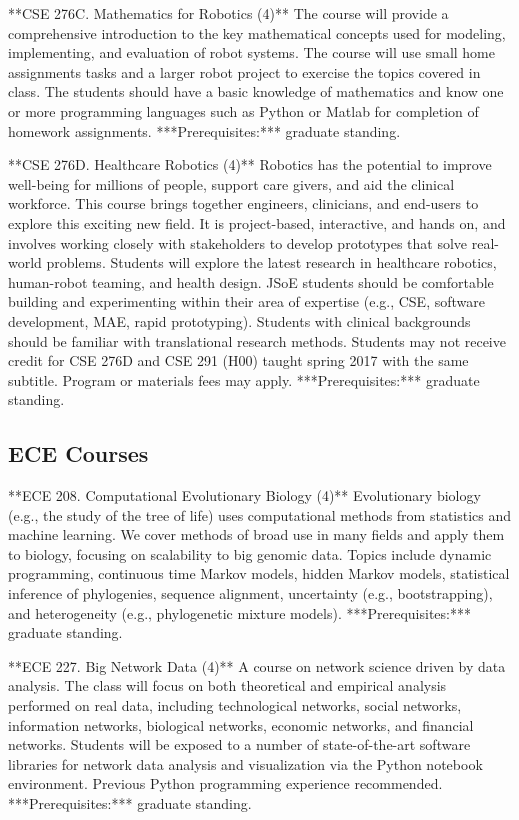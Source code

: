 \documentclass[11pt,letterpaper]{article}
\begin{document}
**CSE 276C. Mathematics for Robotics (4)** The course will provide a
comprehensive introduction to the key mathematical concepts used for
modeling, implementing, and evaluation of robot systems. The course will
use small home assignments tasks and a larger robot project to exercise
the topics covered in class. The students should have a basic knowledge
of mathematics and know one or more programming languages such as Python
or Matlab for completion of homework assignments. ***Prerequisites:***
graduate standing.

**CSE 276D. Healthcare Robotics (4)** Robotics has the potential to
improve well-being for millions of people, support care givers, and aid
the clinical workforce. This course brings together engineers,
clinicians, and end-users to explore this exciting new field. It is
project-based, interactive, and hands on, and involves working closely
with stakeholders to develop prototypes that solve real-world problems.
Students will explore the latest research in healthcare robotics,
human-robot teaming, and health design. JSoE students should be
comfortable building and experimenting within their area of expertise
(e.g., CSE, software development, MAE, rapid prototyping). Students with
clinical backgrounds should be familiar with translational research
methods. Students may not receive credit for CSE 276D and CSE 291 (H00)
taught spring 2017 with the same subtitle. Program or materials fees may
apply. ***Prerequisites:*** graduate standing.

\subsection{ECE Courses}

**ECE 208. Computational Evolutionary Biology (4)** Evolutionary
biology (e.g., the study of the tree of life) uses computational
methods from statistics and machine learning. We cover methods of
broad use in many fields and apply them to biology, focusing on
scalability to big genomic data. Topics include dynamic programming,
continuous time Markov models, hidden Markov models, statistical
inference of phylogenies, sequence alignment, uncertainty (e.g.,
bootstrapping), and heterogeneity (e.g., phylogenetic mixture
models). ***Prerequisites:*** graduate standing.

**ECE 227. Big Network Data (4)** A course on network science driven
by data analysis. The class will focus on both theoretical and
empirical analysis performed on real data, including technological
networks, social networks, information networks, biological networks,
economic networks, and financial networks. Students will be exposed to
a number of state-of-the-art software libraries for network data
analysis and visualization via the Python notebook
environment. Previous Python programming experience
recommended. ***Prerequisites:*** graduate standing.
\end{document}
